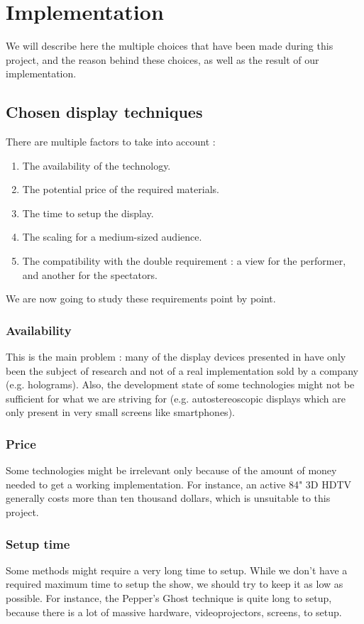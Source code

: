 \section{Implementation}
We will describe here the multiple choices that have been made during this project, and the reason behind these choices, as well as the result of our implementation.

\subsection{Chosen display techniques}
There are multiple factors to take into account : 
\begin{enumerate}
\item The availability of the technology.
\item The potential price of the required materials.
\item The time to setup the display.
\item The scaling for a medium-sized audience.
\item The compatibility with the double requirement : a view for the performer, and another for the spectators.
\end{enumerate}

We are now going to study these requirements point by point.
\subsubsection{Availability}
This is the main problem : many of the display devices presented in  have only been the subject of research and not of a real implementation sold by a company (e.g. holograms). Also, the development state of some technologies  might not be sufficient for what we are striving for (e.g. autostereoscopic displays which are only present in very small screens like smartphones).
\subsubsection{Price}
Some technologies might be irrelevant only because of the amount of money needed to get a working implementation. For instance, an active 84" 3D HDTV generally costs more than ten thousand dollars, which is unsuitable to this project.
\subsubsection{Setup time}
Some methods might require a very long time to setup. While we don't have a required maximum time to setup the show, we should try to keep it as low as possible. For instance, the Pepper's Ghost technique is quite long to setup, because there is a lot of massive hardware, videoprojectors, screens, to setup.
